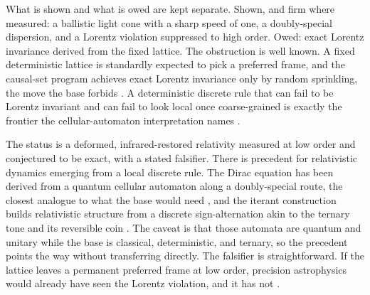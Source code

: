 What is shown and what is owed are kept separate. Shown, and firm where measured:
a ballistic light cone with a sharp speed of one, a doubly-special dispersion,
and a Lorentz violation suppressed to high order. Owed: exact Lorentz invariance
derived from the fixed lattice. The obstruction is well known. A fixed
deterministic lattice is standardly expected to pick a preferred frame, and the
causal-set program achieves exact Lorentz invariance only by random sprinkling,
the move the base forbids \cite{dowker2004}. A deterministic discrete rule that
can fail to be Lorentz invariant and can fail to look local once coarse-grained
is exactly the frontier the cellular-automaton interpretation names
\cite{thooft2016}.

The status is a deformed, infrared-restored relativity measured at low
order and conjectured to be exact, with a stated falsifier. There is precedent
for relativistic dynamics emerging from a local discrete rule. The Dirac equation
has been derived from a quantum cellular automaton along a doubly-special route,
the closest analogue to what the base would need
\cite{dariano2014}, and the iterant construction builds relativistic structure
from a discrete sign-alternation akin to the ternary tone and its reversible coin
\cite{kauffman1996}. The caveat is that those automata are quantum and unitary
while the base is classical, deterministic, and ternary, so the precedent points
the way without transferring directly. The falsifier is straightforward. If the lattice
leaves a permanent preferred frame at low order, precision astrophysics would
already have seen the Lorentz violation, and it has not \cite{cluesurf2026repo}.
